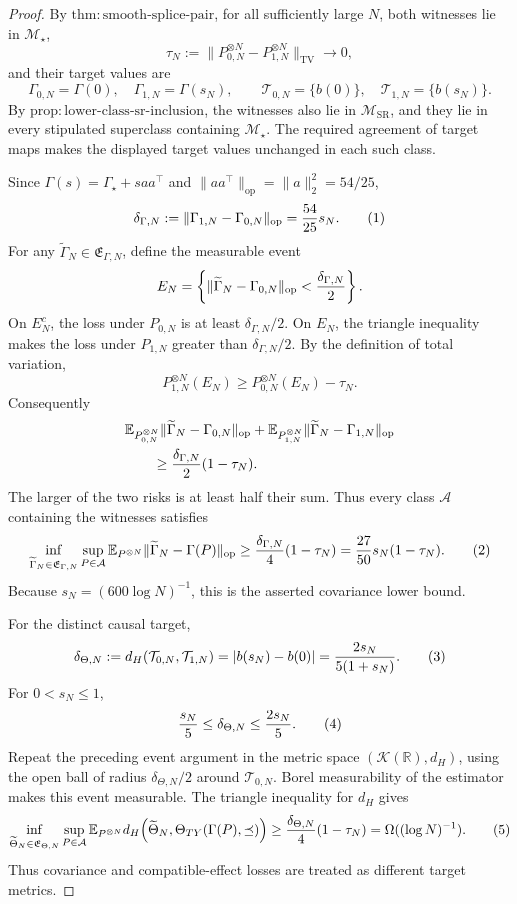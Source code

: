 \documentclass{article}
\begin{document}
\begin{proof}
By \(\mathrm{thm:smooth\text{-}splice\text{-}pair}\), for all sufficiently large \(N\), both witnesses lie in \(\mathcal M_\star\),
\[
 \tau_N:=\|P_{0,N}^{\otimes N}-P_{1,N}^{\otimes N}\|_{\mathrm{TV}}
 \longrightarrow0,
\]
and their target values are
\[
 \Gamma_{0,N}=\Gamma(0),\quad \Gamma_{1,N}=\Gamma(s_N),
 \qquad
 \mathcal T_{0,N}=\{b(0)\},\quad \mathcal T_{1,N}=\{b(s_N)\}.
\]
By \(\mathrm{prop:lower\text{-}class\text{-}sr\text{-}inclusion}\), the witnesses also lie in \(\mathcal M_{\mathrm{SR}}\), and they lie in every stipulated superclass containing \(\mathcal M_\star\).  The required agreement of target maps makes the displayed target values unchanged in each such class.

Since \(\Gamma(s)=\Gamma_\star+saa^\top\) and \(\|aa^\top\|_{\mathrm{op}}=\|a\|_2^2=54/25\),
\[
 \delta_{\Gamma,N}:=\|\Gamma_{1,N}-\Gamma_{0,N}\|_{\mathrm{op}}
 ={54\over25}s_N. \tag{1}
\]
For any \(\widetilde\Gamma_N\in\mathfrak E_{\Gamma,N}\), define the measurable event
\[
 E_N=\left\{\|\widetilde\Gamma_N-\Gamma_{0,N}\|_{\mathrm{op}}
 <{\delta_{\Gamma,N}\over2}\right\}.
\]
On \(E_N^c\), the loss under \(P_{0,N}\) is at least \(\delta_{\Gamma,N}/2\).  On \(E_N\), the triangle inequality makes the loss under \(P_{1,N}\) greater than \(\delta_{\Gamma,N}/2\).  By the definition of total variation,
\[
 P_{1,N}^{\otimes N}(E_N)
 \ge P_{0,N}^{\otimes N}(E_N)-\tau_N.
\]
Consequently
\[
 \begin{aligned}
 &\mathbb E_{P_{0,N}^{\otimes N}}
   \|\widetilde\Gamma_N-\Gamma_{0,N}\|_{\mathrm{op}}
 +\mathbb E_{P_{1,N}^{\otimes N}}
   \|\widetilde\Gamma_N-\Gamma_{1,N}\|_{\mathrm{op}}\\
 &\qquad\ge{\delta_{\Gamma,N}\over2}(1-\tau_N).
 \end{aligned}
\]
The larger of the two risks is at least half their sum.  Thus every class \(\mathcal A\) containing the witnesses satisfies
\[
 \inf_{\widetilde\Gamma_N\in\mathfrak E_{\Gamma,N}}
 \sup_{P\in\mathcal A}
 \mathbb E_{P^{\otimes N}}\|\widetilde\Gamma_N-\Gamma(P)\|_{\mathrm{op}}
 \ge {\delta_{\Gamma,N}\over4}(1-\tau_N)
 ={27\over50}s_N(1-\tau_N). \tag{2}
\]
Because \(s_N=(600\log N)^{-1}\), this is the asserted covariance lower bound.

For the distinct causal target,
\[
 \delta_{\Theta,N}:=d_H(\mathcal T_{0,N},\mathcal T_{1,N})
 =|b(s_N)-b(0)|={2s_N\over5(1+s_N)}. \tag{3}
\]
For \(0<s_N\le1\),
\[
 {s_N\over5}\le\delta_{\Theta,N}\le{2s_N\over5}. \tag{4}
\]
Repeat the preceding event argument in the metric space \((\mathcal K(\mathbb R),d_H)\), using the open ball of radius \(\delta_{\Theta,N}/2\) around \(\mathcal T_{0,N}\).  Borel measurability of the estimator makes this event measurable.  The triangle inequality for \(d_H\) gives
\[
 \inf_{\widetilde\Theta_N\in\mathfrak E_{\Theta,N}}
 \sup_{P\in\mathcal A}
 \mathbb E_{P^{\otimes N}}
 d_H\!\left(\widetilde\Theta_N,
 \Theta_{TY}(\Gamma(P),\preceq)\right)
 \ge {\delta_{\Theta,N}\over4}(1-\tau_N)
 =\Omega((\log N)^{-1}). \tag{5}
\]
Thus covariance and compatible-effect losses are treated as different target metrics.


\end{proof}
\end{document}
